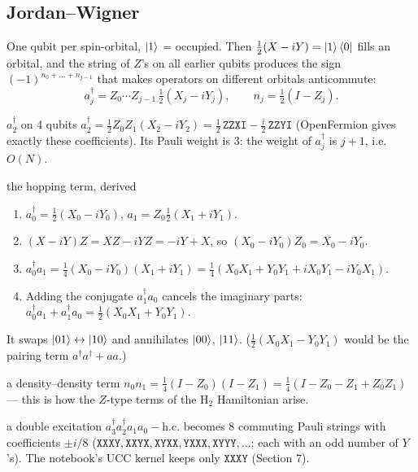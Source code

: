 \documentclass[11pt,a4paper,openany]{book}
\newcounter{wex}[chapter]
\newenvironment{steps}{\begin{enumerate}[label=\textbf{Step \arabic*.}, leftmargin=4.2em, itemsep=2pt]}{\end{enumerate}}
\begin{document}
\subsection{Jordan--Wigner}
One qubit per spin-orbital, $\ket1$ = occupied. Then $\tfrac12(X - iY) = \ket1\bra0$ fills an orbital, and the string of $Z$'s on all earlier
qubits produces the sign $(-1)^{n_0 + \dots + n_{j-1}}$ that makes operators on different orbitals anticommute:
\[ a_j^\dagger = Z_0\cdots Z_{j-1}\,\tfrac12(X_j - iY_j), \qquad n_j = \tfrac12(I - Z_j). \]
\begin{wexample}{$a_2^\dagger$ on 4 qubits}
$a_2^\dagger = \tfrac12Z_0Z_1(X_2 - iY_2) = \tfrac12\,\texttt{ZZXI} - \tfrac i2\,\texttt{ZZYI}$ (OpenFermion gives exactly these coefficients). Its Pauli weight is 3:
the weight of $a_j^\dagger$ is $j + 1$, i.e.\ $O(N)$.
\end{wexample}
\begin{wexample}{the hopping term, derived}
\begin{steps}
\item $a_0^\dagger = \tfrac12(X_0 - iY_0)$, $a_1 = Z_0\tfrac12(X_1 + iY_1)$.
\item $(X - iY)Z = XZ - iYZ = -iY + X$, so $(X_0 - iY_0)Z_0 = X_0 - iY_0$.
\item $a_0^\dagger a_1 = \tfrac14(X_0 - iY_0)(X_1 + iY_1) = \tfrac14(X_0X_1 + Y_0Y_1 + iX_0Y_1 - iY_0X_1)$.
\item Adding the conjugate $a_1^\dagger a_0$ cancels the imaginary parts: $a_0^\dagger a_1 + a_1^\dagger a_0 = \tfrac12(X_0X_1 + Y_0Y_1)$.
\end{steps}
It swaps $\ket{01} \leftrightarrow \ket{10}$ and annihilates $\ket{00}$, $\ket{11}$. ($\tfrac12(X_0X_1 - Y_0Y_1)$ would be the pairing term $a^\dagger a^\dagger + aa$.)
\end{wexample}
\begin{wexample}{a density--density term}
$n_0n_1 = \tfrac14(I - Z_0)(I - Z_1) = \tfrac14(I - Z_0 - Z_1 + Z_0Z_1)$ --- this is how the $Z$-type terms of the H$_2$ Hamiltonian arise.
\end{wexample}
\begin{wexample}{a double excitation}
$a_3^\dagger a_2^\dagger a_1a_0 - \text{h.c.}$ becomes 8 commuting Pauli strings with coefficients $\pm i/8$ ($\texttt{XXXY}, \texttt{XXYX}, \texttt{XYXX}, \texttt{YXXX}, \texttt{XYYY}, \dots$; each with an odd number
of $Y$'s). The notebook's UCC kernel keeps only $\texttt{XXXY}$ (Section 7).
\end{wexample}
\end{document}
